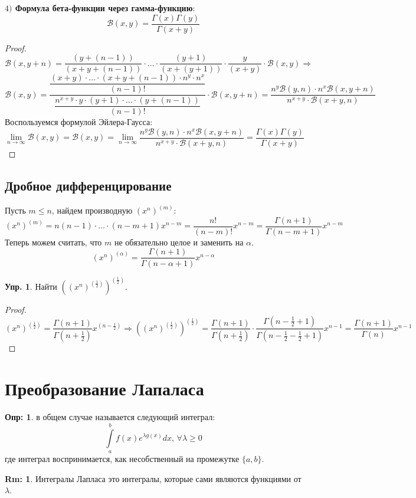 \documentclass[12pt]{article}
\newcommand{\MB}{\mathcal{B}}
\theoremstyle{definition}
\newtheorem{defn}{Опр:}
\newtheorem{rem}{Rm:}
\newtheorem{exrc}{Упр.}
\newcommand{\ddint}[2]{\displaystyle\int\limits_{#1}^{#2}}
\begin{document}
\textbf{$4)$ Формула бета-функции через гамма-функцию}:
$$
	\MB(x,y) = \dfrac{\Gamma(x)\Gamma(y)}{\Gamma(x + y)}
$$
\begin{proof}
	$$
		\MB(x, y + n) = \dfrac{(y + (n - 1))}{(x + y + (n-1))}{\cdot}\dotsc{\cdot}\dfrac{(y+1)}{(x + (y+1))}{\cdot}\dfrac{y}{(x+y)}{\cdot}\MB(x,y) \Rightarrow
	$$
	$$
		\MB(x,y) = \dfrac{\dfrac{(x + y){\cdot}\dotsc{\cdot}(x + y + (n-1)){\cdot}n^y{\cdot}n^x}{(n-1)!}}{\dfrac{n^{x+y}{\cdot}y{\cdot}(y+1){\cdot}\dotsc{\cdot}(y + (n-1))}{(n-1)!}}{\cdot}\MB(x, y + n) = \dfrac{n^y\MB(y,n){\cdot}n^x\MB(x,y + n)}{n^{x+y}{\cdot}\MB(x + y, n)}
	$$
	Воспользуемся формулой Эйлера-Гаусса:
	$$
		\lim\limits_{n \to \infty}\MB(x,y) = \MB(x,y) = \lim\limits_{n \to \infty} \dfrac{n^y\MB(y,n){\cdot}n^x\MB(x,y + n)}{n^{x+y}{\cdot}\MB(x + y, n)} = \dfrac{\Gamma(x)\Gamma(y)}{\Gamma(x + y)}
	$$
\end{proof}

\subsection*{Дробное дифференцирование}
Пусть $m \leq n$, найдем производную $(x^n)^{(m)}$:
$$
	(x^n)^{(m)} = n(n-1){\cdot}\dotsc{\cdot}(n - m + 1)x^{n - m} = \dfrac{n!}{(n-m)!}x^{n-m} = \dfrac{\Gamma(n+1)}{\Gamma(n - m + 1)}x^{n - m}
$$
Теперь можем считать, что $m$ не обязательно целое и заменить на $\alpha$.
$$
	(x^n)^{(\alpha)} = \dfrac{\Gamma(n+1)}{\Gamma(n - \alpha + 1)}x^{n - \alpha}
$$
\begin{exrc}
	Найти $\left((x^n)^{\left(\tfrac{1}{2}\right)}\right)^{\left(\tfrac{1}{2}\right)}$.
\end{exrc}
\begin{proof}
	$$
		(x^n)^{\left(\tfrac{1}{2}\right)} = \dfrac{\Gamma(n + 1)}{\Gamma(n + \tfrac{1}{2})}x^{\left(n - \tfrac{1}{2}\right)} \Rightarrow \left((x^n)^{\left(\tfrac{1}{2}\right)}\right)^{\left(\tfrac{1}{2}\right)} = \dfrac{\Gamma(n + 1)}{\Gamma(n + \tfrac{1}{2})}{\cdot}\dfrac{\Gamma\left(n - \tfrac{1}{2} + 1\right)}{\Gamma\left(n - \tfrac{1}{2} - \tfrac{1}{2} + 1\right)}x^{n - 1} = \dfrac{\Gamma(n+1)}{\Gamma(n)}x^{n-1}
	$$
\end{proof}
\newpage
\section*{Преобразование Лапаласа}

\begin{defn}
	 в общем случае называется следующий интеграл:
	$$
		\ddint{a}{b}f(x)e^{\lambda g(x)}dx, \, \forall \lambda \geq 0
	$$
	где интеграл воспринимается, как несобственный на промежутке $\{a,b\}$.
\end{defn}
\begin{rem}
	Интегралы Лапласа это интегралы, которые сами являются функциями от $\lambda$.
\end{rem}
\end{document}
